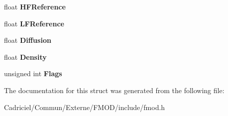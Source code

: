 \begin{DoxyCompactItemize}
\item 
float {\bfseries H\+F\+Reference}\hypertarget{struct_f_m_o_d___r_e_v_e_r_b___p_r_o_p_e_r_t_i_e_s_ac0d48e7775cc35e434535d7b0f41d425}{}\label{struct_f_m_o_d___r_e_v_e_r_b___p_r_o_p_e_r_t_i_e_s_ac0d48e7775cc35e434535d7b0f41d425}

\item 
float {\bfseries L\+F\+Reference}\hypertarget{struct_f_m_o_d___r_e_v_e_r_b___p_r_o_p_e_r_t_i_e_s_ac3edfdcc94df619aa11f5163dfacbfd4}{}\label{struct_f_m_o_d___r_e_v_e_r_b___p_r_o_p_e_r_t_i_e_s_ac3edfdcc94df619aa11f5163dfacbfd4}

\item 
float {\bfseries Diffusion}\hypertarget{struct_f_m_o_d___r_e_v_e_r_b___p_r_o_p_e_r_t_i_e_s_ae4b36833e4d30de592c954af2f0c55b3}{}\label{struct_f_m_o_d___r_e_v_e_r_b___p_r_o_p_e_r_t_i_e_s_ae4b36833e4d30de592c954af2f0c55b3}

\item 
float {\bfseries Density}\hypertarget{struct_f_m_o_d___r_e_v_e_r_b___p_r_o_p_e_r_t_i_e_s_a3672d989ace5e2dc4450b7677fa83f75}{}\label{struct_f_m_o_d___r_e_v_e_r_b___p_r_o_p_e_r_t_i_e_s_a3672d989ace5e2dc4450b7677fa83f75}

\item 
unsigned int {\bfseries Flags}\hypertarget{struct_f_m_o_d___r_e_v_e_r_b___p_r_o_p_e_r_t_i_e_s_a8e2786c436b8b3fa9bc1cbfb3f3b629c}{}\label{struct_f_m_o_d___r_e_v_e_r_b___p_r_o_p_e_r_t_i_e_s_a8e2786c436b8b3fa9bc1cbfb3f3b629c}

\end{DoxyCompactItemize}


The documentation for this struct was generated from the following file\+:\begin{DoxyCompactItemize}
\item 
Cadriciel/\+Commun/\+Externe/\+F\+M\+O\+D/include/fmod.\+h\end{DoxyCompactItemize}

